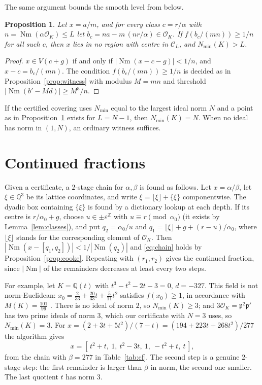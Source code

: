 \documentclass[11pt]{amsart}
\newtheorem{proposition}[theorem]{Proposition}
\theoremstyle{definition}
\theoremstyle{remark}
\numberwithin{equation}{section}
\newcommand{\Q}{\mathbb{Q}}
\newcommand{\Z}{\mathbb{Z}}
\newcommand{\cO}{\mathcal{O}}
\newcommand{\Nm}{\operatorname{Nm}}
\newcommand{\Nmin}{N_{\min}}
\begin{document}
The same argument bounds the smooth level from below.

\begin{proposition}\label{prop:level}
Let $x=a/m$, and for every class $c=r/\alpha$ with $n=\Nm(\alpha\cO_K)\le L$ let
$b_c=na-m\,(nr/\alpha)\in\cO_K$. If $f(b_c/(mn))\ge 1/n$ for all such $c$, then $x$ lies in no
region with centre in $\mathcal C_L$, and $\Nmin(K)>L$.
\end{proposition}

\begin{proof}
$x\in V(c+g)$ if and only if $|\Nm(x-c-g)|<1/n$, and $x-c=b_c/(mn)$. The condition
$f(b_c/(mn))\ge1/n$ is decided as in Proposition~\ref{prop:witness} with modulus $M=mn$ and
threshold $|\Nm(b'-Md)|\ge M^3/n$.
\end{proof}

If the certified covering uses $\Nmin$ equal to the largest ideal norm $N$ and a point as in
Proposition~\ref{prop:level} exists for $L=N-1$, then $\Nmin(K)=N$. When no ideal has norm in
$(1,N)$, an ordinary witness suffices.

\section{Continued fractions}\label{sec:cf}

Given a certificate, a $2$-stage chain for $\alpha,\beta$ is found as follows. Let $x=\alpha/\beta$,
let $\xi\in\Q^3$ be its lattice coordinates, and write $\xi=\lfloor\xi\rfloor+\{\xi\}$
componentwise. The dyadic box containing $\{\xi\}$ is found by a dictionary lookup at each
depth. If its centre is $r/\alpha_0+g$, choose $u\in\pm\varepsilon^{\Z}$ with
$u\equiv r\pmod{\alpha_0}$ (it exists by Lemma~\ref{lem:classes}), and put $q_2=\alpha_0/u$ and
$q_1=\lfloor\xi\rfloor+g+(r-u)/\alpha_0$, where $\lfloor\xi\rfloor$ stands for the corresponding
element of $\cO_K$. Then
$|\Nm(x-[q_1,q_2])|<1/|\Nm(q_2)|$ and \eqref{eq:chain} holds by Proposition~\ref{prop:cooke}.
Repeating with $(r_1,r_2)$ gives the continued fraction, since $|\Nm|$ of the remainders
decreases at least every two steps.

For example, let $K=\Q(t)$ with $t^3-t^2-2t-3=0$, $d=-327$. This field is not norm-Euclidean:
$x_0=\frac{2}{33}+\frac{20}{33}t+\frac{5}{11}t^2$ satisfies $f(x_0)\ge1$, in accordance with
$M(K)=\frac{101}{99}$ \cite{CL}. There is no ideal of norm $2$, so $\Nmin(K)\ge3$; and
$3\cO_K=\mathfrak p^2\mathfrak p'$ has two prime ideals of norm $3$, which our certificate with
$N=3$ uses, so $\Nmin(K)=3$. For $x=(2+3t+5t^2)/(7-t)=(194+223t+268t^2)/277$ the algorithm gives
\[
  x=[\,t^2+t,\ 1,\ t^2-3t,\ 1,\ -t^2+t,\ t\,],
\]
from the chain with $\beta=277$ in Table~\ref{tab:cf}. The second step is a genuine $2$-stage
step: the first remainder is larger than $\beta$ in norm, the second one smaller. The last
quotient $t$ has norm $3$.
\end{document}
